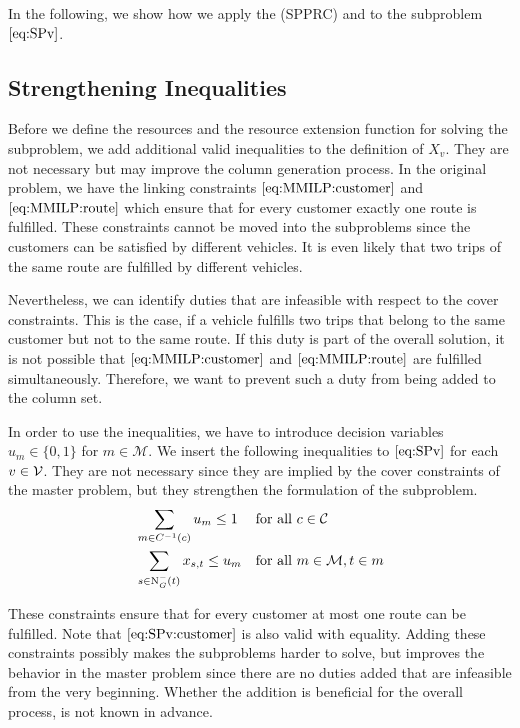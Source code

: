 In the following, we show how we apply the (SPPRC) and  to the subproblem $\eqref{eq:SPv}$.


\subsection{Strengthening Inequalities}

Before we define the resources and the resource extension function for solving the subproblem, we add additional valid inequalities to the definition of $X_v$. They are not necessary but may improve the column generation process. In the original problem, we have the linking constraints $\eqref{eq:MMILP:customer}$ and $\eqref{eq:MMILP:route}$ which ensure that for every customer exactly one route is fulfilled. These constraints cannot be moved into the subproblems since the customers can be satisfied by different vehicles. It is even likely that two trips of the same route are fulfilled by different vehicles.

Nevertheless, we can identify duties that are infeasible with respect to the cover constraints. This is the case, if a vehicle fulfills two trips that belong to the same customer but not to the same route. If this duty is part of the overall solution, it is not possible that $\eqref{eq:MMILP:customer}$ and $\eqref{eq:MMILP:route}$ are fulfilled simultaneously. Therefore, we want to prevent such a duty from being added to the column set.

In order to use the inequalities, we have to introduce decision variables $u_m\in\{0,1\}$ for $m\in\mathcal{M}$. We insert the following inequalities to $\eqref{eq:SPv}$ for each $v\in\mathcal{V}$. They are not necessary since they are implied by the cover constraints of the master problem, but they strengthen the formulation of the subproblem.
\begin{align}
	& \sum_{m\in C^{-1}(c)} u_m \leq 1 && \text{for all } c\in\mathcal{C} \label{eq:SPv:customer} \\
	& \sum_{s\in\operatorname{N}_G^-(t)} x_{s,t} \leq u_m && \text{for all } m\in\mathcal{M}, t\in m \label{eq:SPv:route}
\end{align}

These constraints ensure that for every customer at most one route can be fulfilled. Note that $\eqref{eq:SPv:customer}$ is also valid with equality. Adding these constraints possibly makes the subproblems harder to solve, but improves the behavior in the master problem since there are no duties added that are infeasible from the very beginning. Whether the addition is beneficial for the overall process, is not known in advance.

